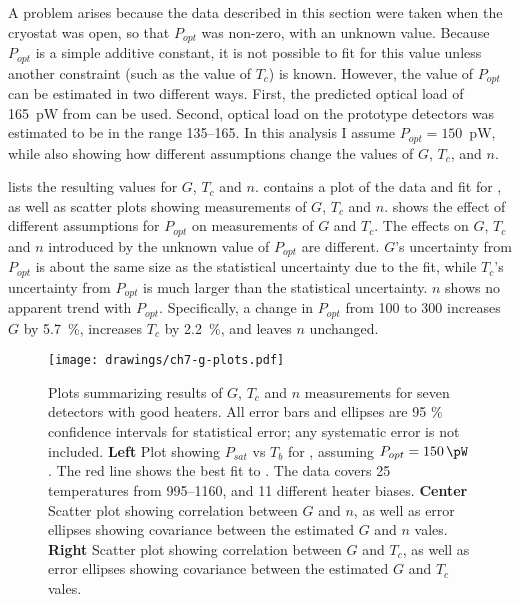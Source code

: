A problem arises because the data described in this section were taken when the cryostat was open, so that $P_{opt}$ was non-zero, with an unknown value.
Because $P_{opt}$ is a simple additive constant, it is not possible to fit for this value unless another constraint (such as the value of $T_c$) is known.
However, the value of $P_{opt}$ can be estimated in two different ways. 
First, the predicted optical load of 165~pW from  can be used.
Second, optical load on the prototype detectors was estimated to be in the range \SIrange{135}{165}{\pW}.
In this analysis I assume $P_{opt} = 150$~pW, while also showing how different assumptions change the values of  $G$, $T_c$, and $n$.

 lists the resulting values for $G$, $T_c$ and $n$.
 contains a plot of the data and fit for , as well as scatter plots showing measurements of $G$, $T_c$ and $n$.
 shows the effect of different assumptions for $P_{opt}$ on measurements of $G$ and $T_c$.
The effects on $G$, $T_c$ and $n$ introduced by the unknown value of $P_{opt}$ are different.
$G$'s uncertainty from $P_{opt}$ is about the same size as the statistical uncertainty due to the fit, while $T_c$'s uncertainty from $P_{opt}$ is much larger than the statistical uncertainty.
$n$ shows no apparent trend with $P_{opt}$.
Specifically, a change in $P_{opt}$ from \SI{100}{\pW} to \SI{300}{\pW} increases $G$ by \SI{5.7}{\percent}, increases $T_c$ by \SI{2.2}{\percent}, and leaves $n$ unchanged.

\begin{figure*}
\texttt{[image: drawings/ch7-g-plots.pdf]}
\caption{Plots summarizing results of $G$, $T_c$ and $n$ measurements for seven detectors with good heaters.
All error bars and ellipses are 95 \% confidence intervals for statistical error; any systematic error is not included.
\textbf{Left} Plot showing $P_{sat}$ vs $T_b$ for , assuming $P_{opt} = \SI{150}{\pW}$.
The red line shows the best fit to .
The data covers 25 temperatures from \SIrange{995}{1160}{\mK}, and 11 different heater biases.
\textbf{Center} Scatter plot showing correlation between $G$ and $n$, as well as error ellipses showing covariance between the estimated $G$ and $n$ vales.
\textbf{Right} Scatter plot showing correlation between $G$ and $T_c$, as well as error ellipses showing covariance between the estimated $G$ and $T_c$ vales.
} 
\label{fig:heater-g-plots}
\end{figure*}

